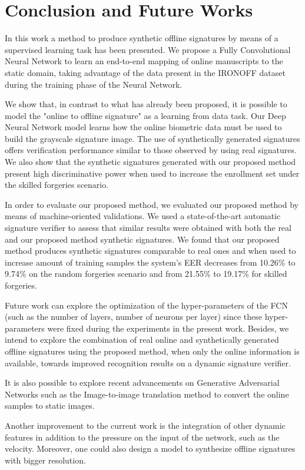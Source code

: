 
\chapter{Conclusion and Future Works}\label{ch:conclusion}

In this work a method to produce synthetic offline signatures by means of a supervised learning task has been presented. We propose a Fully Convolutional Neural Network to learn an end-to-end mapping of online manuscripts to the static domain, taking advantage of the data present in the IRONOFF dataset during the training phase of the Neural Network. 

We show that, in contrast to what has already been proposed, it is possible to model the "online to offline signature" as a learning from data task. Our Deep Neural Network model learns how the online biometric data must be used to build the grayscale signature image.  The use of synthetically generated signatures offers verification performance similar to those observed by using real signatures. We also show that the synthetic signatures generated with our proposed method present high discriminative power when used to increase the enrollment set under the skilled forgeries scenario. 

In order to evaluate our proposed method, we evaluated our proposed method by means of machine-oriented validations. We used a state-of-the-art automatic signature verifier to assess that similar results were obtained with both the real and our proposed method synthetic signatures. We found that our proposed method produces synthetic signatures comparable to real ones and when used to increase amount of training samples the system's EER decreases from 10.26\% to 9.74\% on the random forgeries scenario and from 21.55\% to 19.17\% for skilled forgeries.

Future work can explore the optimization of the hyper-parameters of the FCN (such as the number of layers, number of neurons per layer) since these hyper-parameters were fixed during the experiments in the present work. Besides, we intend to explore the combination of real online and synthetically generated offline signatures using the proposed method, when only the online information is available, towards improved recognition results on a dynamic signature verifier.

It is also possible to explore recent advancements on Generative Adversarial Networks \cite{goodfellow2014generative} such as the Image-to-image translation \cite{isola2016image} method to convert the online samples to static images.

Another improvement to the current work is the integration of other dynamic features in addition to the pressure on the input of the network, such as the velocity. Moreover, one could also design a model to synthesize offline signatures with bigger resolution.